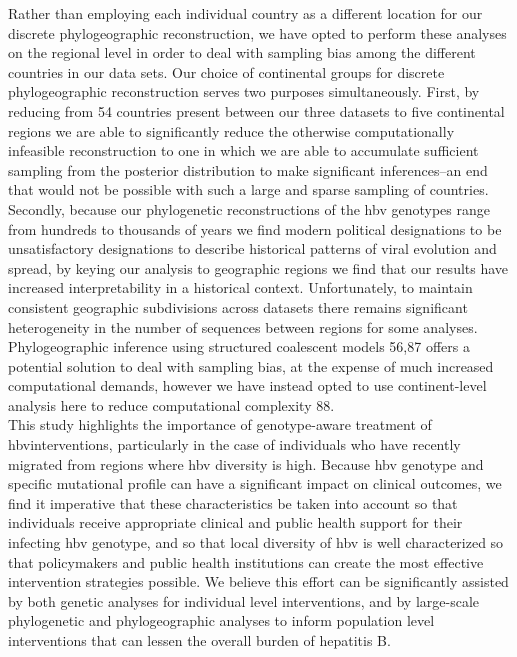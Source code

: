 Rather than employing each individual country as a different location for our discrete phylogeographic reconstruction, we have opted to perform these analyses on the regional level in order to deal with sampling bias among the different countries in our data sets. Our choice of continental groups for discrete phylogeographic reconstruction serves two purposes simultaneously. First, by reducing from 54 countries present between our three datasets to five continental regions we are able to significantly reduce the otherwise computationally infeasible reconstruction to one in which we are able to accumulate sufficient sampling from the posterior distribution to make significant inferences–an end that would not be possible with such a large and sparse sampling of countries. Secondly, because our phylogenetic reconstructions of the \gls{hbv} genotypes range from hundreds to thousands of years we find modern political designations to be unsatisfactory designations to describe historical patterns of viral evolution and spread, by keying our analysis to geographic regions we find that our results have increased interpretability in a historical context.   Unfortunately, to maintain consistent geographic subdivisions across datasets there remains significant heterogeneity in the number of sequences between regions for some analyses. Phylogeographic inference using structured coalescent models 56,87 offers a potential solution to deal with sampling bias, at the expense of much increased computational demands, however we have instead opted to use continent-level analysis here to reduce computational complexity  88.\\

This study highlights the importance of genotype-aware treatment of \gls{hbv}interventions, particularly in the case of individuals who have recently migrated from regions where \gls{hbv} diversity is high. Because \gls{hbv} genotype and specific mutational profile can have a significant impact on clinical outcomes, we find it imperative that these characteristics be taken into account so that individuals receive appropriate clinical and public health support for their infecting \gls{hbv} genotype, and so that local diversity of \gls{hbv} is well characterized so that policymakers and public health institutions can create the most effective intervention strategies possible. We believe this effort can be significantly assisted by both genetic analyses for individual level interventions, and by large-scale phylogenetic and phylogeographic analyses to inform population level interventions that can lessen the overall burden of hepatitis B.

